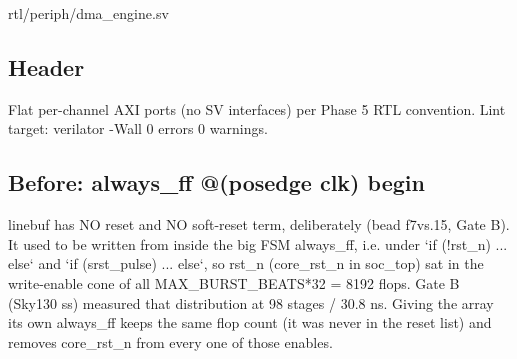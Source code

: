 \begin{relocated}{rtl/periph/dma_engine.sv}

\subsection*{Header}

\begin{textblock}
Flat per-channel AXI ports (no SV interfaces) per Phase 5 RTL convention.
Lint target: verilator -Wall 0 errors 0 warnings.
\end{textblock}

\subsection*{Before: always\_ff @(posedge clk) begin}

\begin{textblock}
linebuf has NO reset and NO soft-reset term, deliberately (bead f7vs.15, Gate B).
It used to be written from inside the big FSM always_ff, i.e. under `if (!rst_n) ... else`
and `if (srst_pulse) ... else`, so rst_n (core_rst_n in soc_top) sat in the write-enable
cone of all MAX_BURST_BEATS*32 = 8192 flops. Gate B (Sky130 ss) measured that distribution at
98 stages / 30.8 ns. Giving the array its own always_ff keeps the same flop count (it was never
in the reset list) and removes core_rst_n from every one of those enables.


\end{textblock}
\end{relocated}
